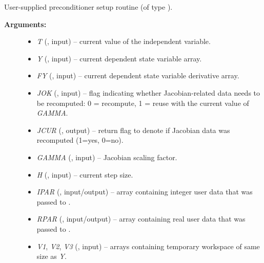 \documentclass[letterpaper,10pt,english]{sphinxmanual}
\begin{document}
\begin{fulllineitems}
\label{f_interface/Usage:f/_/FARKPSET}
User-supplied preconditioner setup routine (of type
{\hyperref[c_interface/User_supplied:c.ARKSpilsPrecSetupFn]{\emph{}}}).
\begin{description}
\item[{\textbf{Arguments:}}] \leavevmode\begin{itemize}
\item {} 
\emph{T} (, input) -- current value of the independent variable.

\item {} 
\emph{Y} (, input) -- current dependent state variable array.

\item {} 
\emph{FY} (, input) -- current dependent state variable derivative array.

\item {} 
\emph{JOK} (, input) -- flag indicating whether Jacobian-related data needs to be
recomputed: 0 = recompute, 1 = reuse with the current value of \emph{GAMMA}.

\item {} 
\emph{JCUR} (, output) -- return flag to denote if
Jacobian data was recomputed (1=yes, 0=no).

\item {} 
\emph{GAMMA} (, input) -- Jacobian scaling factor.

\item {} 
\emph{H} (, input) -- current step size.

\item {} 
\emph{IPAR} (, input/output) -- array containing integer user data that was passed to
{\hyperref[f_interface/Usage:f/_/FARKMALLOC]{\emph{}}}.

\item {} 
\emph{RPAR} (, input/output) -- array containing real user data that was passed to
{\hyperref[f_interface/Usage:f/_/FARKMALLOC]{\emph{}}}.

\item {} 
\emph{V1}, \emph{V2}, \emph{V3} (, input) -- arrays containing temporary workspace of
same size as \emph{Y}.


\end{itemize}
\end{description}
\end{fulllineitems}
\end{document}
